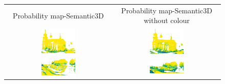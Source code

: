     \begin{figure}[h!]
        \centering
        \begin{tabular}{cc}
            Probability map-Semantic3D & Probability map-Semantic3D without colour \\
            \includegraphics[width=0.33\textwidth, height=0.18\textheight]{images/ood_imgs/de_sem3d/de_prob_10_1.pdf}&
            \includegraphics[width=0.33\textwidth, height=0.18\textheight]{images/sem3d_of/de_prob_sem3d_of_1.pdf}\\

            \includegraphics[width=0.33\textwidth, height=0.18\textheight]{images/ood_imgs/de_sem3d/de_prob_10_2.pdf}&
            \includegraphics[width=0.33\textwidth, height=0.18\textheight]{images/sem3d_of/de_prob_sem3d_of_2.pdf}\\


\end{tabular}
\end{figure}
